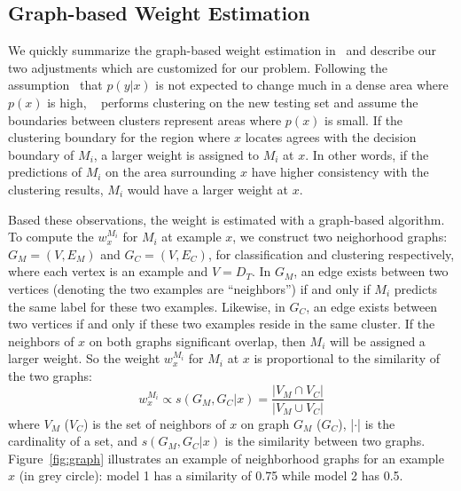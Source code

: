 \subsection{Graph-based Weight Estimation}\label{sec:gwe}
We quickly summarize the graph-based weight estimation in~\cite{lwe} and describe our two adjustments which are customized for our problem.
Following the assumption~\cite{cluster} that $p(y|x)$ is not expected to change much in a dense area where $p(x)$ is high, 
~\cite{lwe} performs clustering on the new testing set and assume the boundaries between clusters represent areas where $p(x)$ is small.
If the clustering boundary for the region where $x$ locates agrees with the decision boundary of $M_i$, 
a larger weight is assigned to $M_i$ at $x$.
In other words, if the predictions of $M_i$ on the area surrounding $x$ have higher consistency with the clustering results, $M_i$ would have a larger weight at $x$. 

Based these observations, the weight is estimated with a graph-based algorithm.
To compute the $w_{x}^{M_i}$ for $M_i$ at example $x$, we construct two neighorhood graphs: 
$G_M = (V, E_M)$ and $G_C = (V, E_C)$, for classification and clustering respectively, 
where each vertex is an example and $V = D_T$. In $G_M$, an edge exists between two vertices (denoting the two examples are ``neighbors'') if and only if $M_i$ predicts the same label for these two examples. Likewise, in $G_C$, an edge exists between two vertices if and only if these two examples reside in the same cluster.
If the neighbors of $x$ on both graphs significant overlap, then $M_i$ will be assigned a larger weight.
So the weight $w_{x}^{M_i}$ for $M_i$ at $x$ is proportional to the similarity of the two graphs:
\begin{equation}\label{eq_sim}
w_{x}^{M_i} \propto s(G_M, G_C|x) = \frac {|V_M \cap V_C|} {|V_M \cup V_C|}
\end{equation}
where $V_M$ ($V_C$) is the set of neighbors of $x$ on graph $G_M$ ($G_C$), |$\cdot$| is the cardinality of a set, and $s(G_M, G_C|x)$ is the similarity between two graphs. 
Figure~\ref{fig:graph} illustrates an example of neighborhood graphs for an example $x$ (in grey circle): model 1 has a similarity of 0.75 while model 2 has 0.5.

